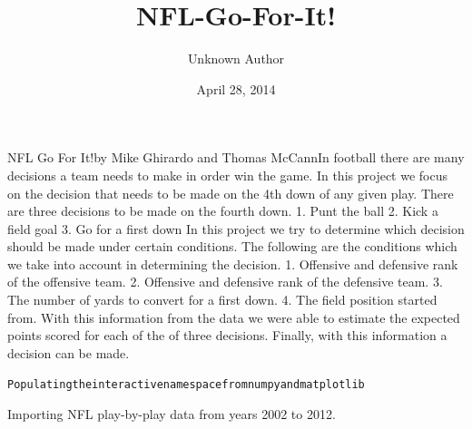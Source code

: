 \documentclass[letterpaper,10pt,english]{/anaconda/lib/python2.7/site-packages/sphinx/texinputs/sphinxhowto}
\title{NFL-Go-For-It!}
\date{April 28, 2014}
\author{Unknown Author}
\newenvironment{InvisibleVerbatim}
        {\begin{mdframed}[leftmargin=0.1\linewidth,innerleftmargin=3pt,innerrightmargin=3pt, userdefinedwidth=1\linewidth, linewidth=0pt, linecolor=white, usetwoside=false]}
        {\end{mdframed}}
\begin{document}
        
            \maketitle
        

        


        
        NFL Go For It!by Mike Ghirardo and Thomas McCannIn football there are many decisions a team needs to make in order win
the game. In this project we focus on the decision that needs to be made
on the 4th down of any given play. There are three decisions to be made
on the fourth down. 1. Punt the ball 2. Kick a field goal 3. Go for a
first down In this project we try to determine which decision should be
made under certain conditions. The following are the conditions which we
take into account in determining the decision. 1. Offensive and
defensive rank of the offensive team. 2. Offensive and defensive rank of
the defensive team. 3. The number of yards to convert for a first down.
4. The field position started from. With this information from the data
we were able to estimate the expected points scored for each of the of
three decisions. Finally, with this information a decision can be made.

    

        
        

            
                \begin{InvisibleVerbatim}
                \vspace{-0.5\baselineskip}
\begin{alltt}Populating the interactive namespace from numpy and matplotlib
\end{alltt}

            \end{InvisibleVerbatim}
            
        
    
Importing NFL play-by-play data from years 2002 to 2012.

    

        
\end{document}
